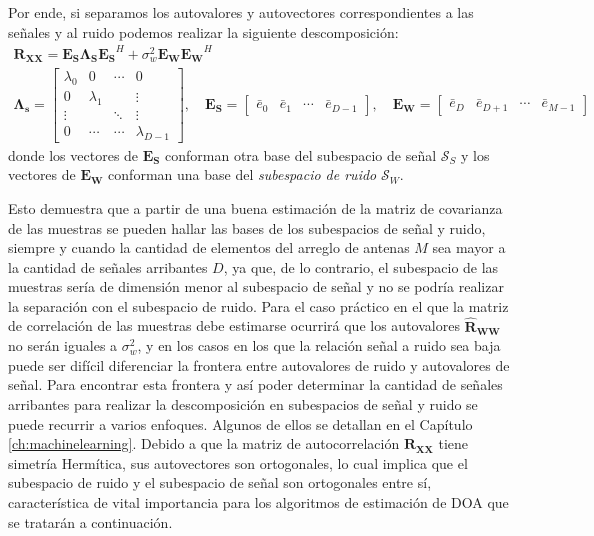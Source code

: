 Por ende, si separamos los autovalores y autovectores correspondientes a las señales y al ruido podemos realizar la siguiente descomposición:
\begin{gather}
    \mathbf{R_{XX}}=\mathbf{E_S \Lambda_S E_S}^H + \sigma^2_w \mathbf{E_W E_W}^H
    \label{eq:doaest_es_en}\\
    \mathbf{\Lambda_s}=    \begin{bmatrix}
        \lambda_0 & 0         & \cdots & 0             \\
        0         & \lambda_1 &        & \vdots        \\
        \vdots    &           & \ddots & \vdots        \\
        0         & \cdots    & \cdots & \lambda_{D-1}
    \end{bmatrix},\quad
    \mathbf{E_S}=\begin{bmatrix}
        \bar{e}_0 & \bar{e}_1 & \cdots & \bar{e}_{D-1}
    \end{bmatrix},\quad
    \mathbf{E_W}=\begin{bmatrix}
        \bar{e}_{D} & \bar{e}_{D+1} & \cdots & \bar{e}_{M-1}
    \end{bmatrix}\nonumber
\end{gather}
donde los vectores de $\mathbf{E_S}$ conforman otra base del subespacio de señal $\mathcal{S}_S$ y los vectores de $\mathbf{E_W}$ conforman una base del \emph{subespacio de ruido} $\mathcal{S}_W$.

Esto demuestra que a partir de una buena estimación de la matriz de covarianza de las muestras se pueden hallar las bases de los subespacios de señal y ruido, siempre y cuando la cantidad de elementos del arreglo de antenas $M$ sea mayor a la cantidad de señales arribantes $D$, ya que, de lo contrario, el subespacio de las muestras sería de dimensión menor al subespacio de señal y no se podría realizar la separación con el subespacio de ruido. Para el caso práctico en el que la matriz de correlación de las muestras debe estimarse ocurrirá que los autovalores $\mathbf{\hat{R}_{WW}}$ no serán iguales a $\sigma^2_w$, y en los casos en los que la relación señal a ruido sea baja puede ser difícil diferenciar la frontera entre autovalores de ruido y autovalores de señal. Para encontrar esta frontera y así poder determinar la cantidad de señales arribantes para realizar la descomposición en subespacios de señal y ruido se puede recurrir a varios enfoques. Algunos de ellos se detallan en el Capítulo \ref{ch:machinelearning}. Debido a que la matriz de autocorrelación $\mathbf{R_{XX}}$ tiene simetría Hermítica, sus autovectores son ortogonales, lo cual implica que el subespacio de ruido y el subespacio de señal son ortogonales entre sí, característica de vital importancia para los algoritmos de estimación de DOA que se tratarán a continuación.

